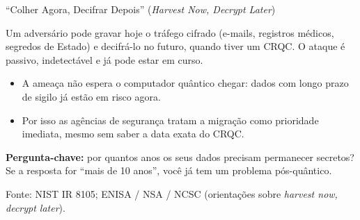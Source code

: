 \documentclass{beamer}
\begin{document}
\begin{frame}{``Colher Agora, Decifrar Depois'' (\textit{Harvest Now, Decrypt Later})}
    \begin{tcolorbox}[colback=red!5,colframe=red!60!black,boxrule=0.5pt]
        \footnotesize
        Um adversário pode gravar hoje o tráfego cifrado (e-mails, registros médicos, segredos de Estado) e decifrá-lo no futuro, quando tiver um CRQC. O ataque é passivo, indetectável e já pode estar em curso.
    \end{tcolorbox}
    \medskip
    \begin{itemize}
        \footnotesize
        \item A ameaça não espera o computador quântico chegar: dados com longo prazo de sigilo já estão em risco agora.
        \item Por isso as agências de segurança tratam a migração como prioridade imediata, mesmo sem saber a data exata do CRQC.
    \end{itemize}
    \medskip
    \begin{tcolorbox}[colback=blue!5,colframe=blue!50!black,boxrule=0.5pt]
        \footnotesize
        \textbf{Pergunta-chave:} por quantos anos os seus dados precisam permanecer secretos? Se a resposta for ``mais de 10 anos'', você já tem um problema pós-quântico.
    \end{tcolorbox}
    \smallskip
    {\tiny Fonte: NIST IR 8105; ENISA / NSA / NCSC (orientações sobre \textit{harvest now, decrypt later}).}
\end{frame}
\end{document}
